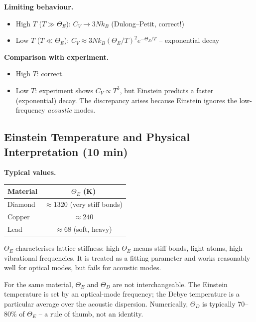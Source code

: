 \documentclass[11pt,a4paper]{article}
\begin{document}
\textbf{Limiting behaviour.}
\begin{itemize}
\item High $T$ ($T\gg\Theta_E$): $C_V\to 3Nk_B$ (Dulong--Petit, correct!)
\item Low $T$ ($T\ll\Theta_E$): $C_V\approx 3Nk_B(\Theta_E/T)^2e^{-\Theta_E/T}$ -- exponential decay
\end{itemize}

\textbf{Comparison with experiment.}
\begin{itemize}
\item High $T$: correct.
\item Low $T$: experiment shows $C_V\propto T^3$, but Einstein predicts a faster
(exponential) decay. The discrepancy arises because Einstein ignores the
low-frequency \emph{acoustic} modes.
\end{itemize}

\subsection{Einstein Temperature and Physical Interpretation \hfill \small(10 min)}

\textbf{Typical values.}
\begin{center}
\begin{tabular}{lc}
\toprule
Material & $\Theta_E$ (K)\\
\midrule
Diamond & $\approx 1320$ (very stiff bonds)\\
Copper & $\approx 240$\\
Lead & $\approx 68$ (soft, heavy)\\
\bottomrule
\end{tabular}
\end{center}

\begin{physbox}
$\Theta_E$ characterises lattice stiffness: high $\Theta_E$ means stiff bonds,
light atoms, high vibrational frequencies. It is treated as a fitting parameter and
works reasonably well for optical modes, but fails for acoustic modes.
\end{physbox}

\begin{pitbox}
For the same material, $\Theta_E$ and $\Theta_D$ are not interchangeable. The
Einstein temperature is set by an optical-mode frequency; the Debye temperature
is a particular average over the acoustic dispersion. Numerically, $\Theta_D$ is
typically 70--80\% of $\Theta_E$ -- a rule of thumb, not an identity.
\end{pitbox}
\end{document}
